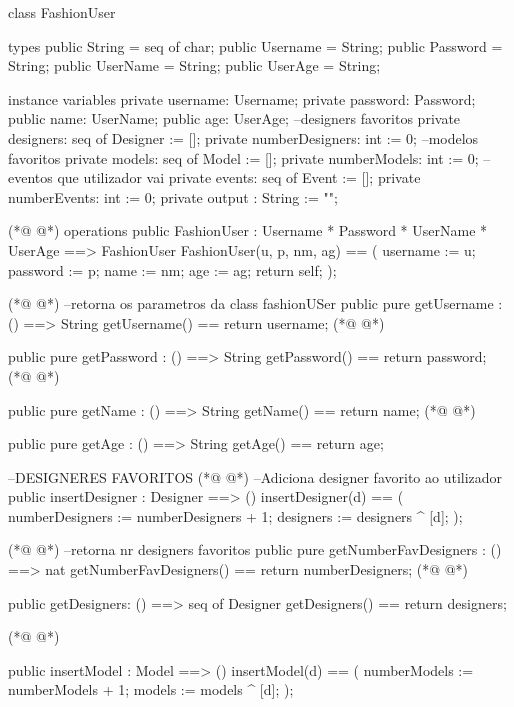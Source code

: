 \begin{vdmpp}[breaklines=true]
class FashionUser

types
 public String = seq of char;
 public Username = String;
 public Password = String;
 public UserName = String;
 public UserAge = String;
 
instance variables
 private username: Username;
 private password: Password;
 public name: UserName;
 public age: UserAge;
 --designers favoritos
 private  designers: seq of Designer := [];
 private  numberDesigners: int := 0;
  --modelos favoritos
 private  models: seq of Model := [];
 private  numberModels: int := 0;
 --eventos que utilizador vai
 private events: seq of Event := [];
 private  numberEvents: int := 0;
 private output : String := "";

(*@
\label{FashionUser:26}
@*)
operations  
  public FashionUser : Username *
            Password *
            UserName *
            UserAge  ==> FashionUser
  FashionUser(u, p, nm, ag) ==
  (
   username := u;
   password := p;
    name := nm;
    age := ag;
    return self;
  );
  
(*@
\label{getUsername:40}
@*)
  --retorna os parametros da class fashionUSer
  public pure getUsername : () ==> String
    getUsername() == return username;
(*@
\label{getPassword:43}
@*)
    
  public pure getPassword : () ==> String
    getPassword() == return password;
(*@
\label{getName:46}
@*)
  
  public pure getName : () ==> String
    getName() == return name;
(*@
\label{getAge:49}
@*)
    
   public pure getAge : () ==> String
     getAge() == return age;
     
  
   
    --DESIGNERES FAVORITOS  
(*@
\label{insertDesigner:56}
@*)
   --Adiciona designer favorito ao utilizador
  public insertDesigner : Designer ==> ()
   insertDesigner(d) ==
   (
     numberDesigners := numberDesigners + 1;
     designers := designers ^ [d];
   );
   
(*@
\label{getNumberFavDesigners:64}
@*)
  --retorna nr designers favoritos
   public pure getNumberFavDesigners : () ==> nat
   getNumberFavDesigners() == return numberDesigners;
(*@
\label{getDesigners:67}
@*)
   
   public getDesigners: () ==> seq of Designer
   getDesigners() == return designers;
   
(*@
\label{insertModel:71}
@*)
   
   public insertModel : Model ==> ()
   insertModel(d) ==
   (
     numberModels := numberModels + 1;
     models := models ^ [d];
   );
   

\end{vdmpp}
